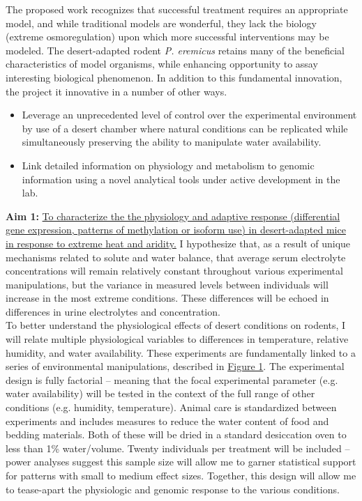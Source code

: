\documentclass[11pt]{article}
\begin{document}
The proposed work recognizes that successful treatment requires an appropriate model, and while traditional models are wonderful, they lack the biology (extreme osmoregulation) upon which more successful interventions may be modeled. The desert-adapted rodent \textit{P. eremicus} retains many of the beneficial characteristics of model organisms, while enhancing opportunity to assay interesting biological phenomenon. In addition to this fundamental innovation, the project it innovative in a number of other ways.
\begin{itemize}
\item Leverage an unprecedented level of control over the experimental environment by use of a desert chamber where natural conditions can be replicated while simultaneously preserving the ability to manipulate water availability. 
\item Link detailed information on physiology and metabolism to genomic information using a novel analytical tools under active development in the lab.
\end{itemize}

 

\newpage

\linespread{1.2}

\noindent \textbf{Aim 1:} \ul{To characterize the the physiology and adaptive response (differential gene expression, patterns of methylation or isoform use) in desert-adapted mice in response to extreme heat and aridity.} I hypothesize that, as a result of unique mechanisms related to solute and water balance, that average serum electrolyte concentrations will remain relatively constant throughout various experimental manipulations, but the variance in measured levels between individuals will increase in the most extreme conditions. These differences will be echoed in differences in urine electrolytes and concentration. \\

To better understand the physiological effects of desert conditions on rodents, I will relate multiple physiological variables to differences in temperature, relative humidity, and water availability. These experiments are fundamentally linked to a series of environmental manipulations, described in \hyperlink{Figure 1}{Figure 1}. The experimental design is fully factorial -- meaning that the focal experimental parameter (e.g. water availability) will be tested in the context of the full range of other conditions (e.g. humidity, temperature). Animal care is standardized between experiments and includes measures to reduce the water content of food and bedding materials. Both of these will be dried in a standard desiccation oven to less than 1\% water/volume. Twenty individuals per treatment will be included -- power analyses suggest this sample size will allow me to garner statistical support for patterns with small to medium effect sizes. Together, this design will allow me to tease-apart the physiologic and genomic response to the various conditions. \\
\end{document}
